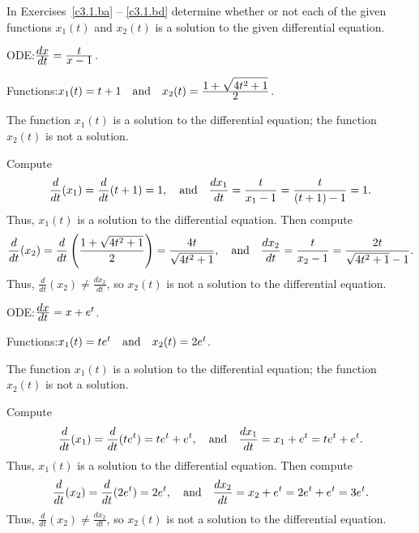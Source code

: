 \documentclass{ximera}
\begin{document}
\noindent In Exercises~\ref{c3.1.ba} -- \ref{c3.1.bd} determine whether
or not each of the given functions $x_1(t)$ and $x_2(t)$ is a solution 
to the given differential equation.
\begin{exercise}  \label{c3.1.ba}
ODE:\quad $\frac{\displaystyle dx}{\displaystyle dt} = \frac{\displaystyle t}{\displaystyle x-1}$.

Functions:\quad $x_1(t)=t+1 \quad\mbox{and}\quad x_2(t)= \frac{\displaystyle 1+\sqrt{4t^2+1}}{\displaystyle 2}$.

\begin{solution}

\ans The function $x_1(t)$ is a solution to the differential equation;
the function $x_2(t)$ is not a solution.

\soln Compute
\[
\frac{d}{dt}(x_1) = \frac{d}{dt}(t + 1) = 1, \quad\mbox{and}\quad
\frac{dx_1}{dt} = \frac{t}{x_1 - 1} = \frac{t}{(t + 1) - 1} = 1.
\]
Thus, $x_1(t)$ is a solution to the differential equation.  Then compute
\[
\frac{d}{dt}(x_2) = \frac{d}{dt}\left(\frac{1 + \sqrt{4t^2 + 1}}{2}\right)
= \frac{4t}{\sqrt{4t^2 + 1}}, \quad\mbox{and}\quad
\frac{dx_2}{dt} = \frac{t}{x_2 - 1} = \frac{2t}{\sqrt{4t^2 + 1} - 1}.
\]
Thus, $\frac{d}{dt}(x_2) \neq \frac{dx_2}{dt}$, so $x_2(t)$ is not a
solution to the differential equation.


\end{solution}
\end{exercise}
\begin{exercise}  \label{c3.1.bb}
ODE:\quad $\frac{\displaystyle dx}{\displaystyle dt} = x + e^t$.

Functions:\quad $x_1(t)=te^t \quad\mbox{and}\quad x_2(t)= 2e^t$.

\begin{solution}

\ans The function $x_1(t)$ is a solution to the differential equation;
the function $x_2(t)$ is not a solution.

\soln Compute
\[
\frac{d}{dt}(x_1) = \frac{d}{dt}(te^t) = te^t + e^t, \quad\mbox{and}\quad
\frac{dx_1}{dt} = x_1 + e^t = te^t + e^t.
\]
Thus, $x_1(t)$ is a solution to the differential equation.  Then compute
\[
\frac{d}{dt}(x_2) = \frac{d}{dt}(2e^t) = 2e^t, \quad\mbox{and}\quad
\frac{dx_2}{dt} = x_2 + e^t = 2e^t + e^t = 3e^t.
\]
Thus, $\frac{d}{dt}(x_2) \neq \frac{dx_2}{dt}$, so $x_2(t)$ is not a
solution to the differential equation.

\end{solution}
\end{exercise}
\end{document}
